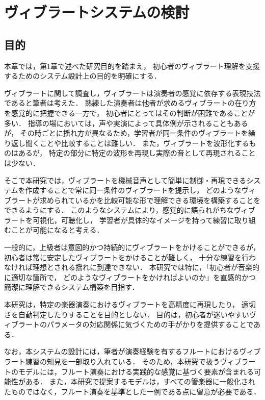 \section{ヴィブラートシステムの検討}

\subsection{目的}

本章では，第1章で述べた研究目的を踏まえ，
初心者のヴィブラート理解を支援するためのシステム設計上の目的を明確にする．

ヴィブラートに関して調査し，ヴィブラートは演奏者の感覚に依存する表現技法であると筆者は考えた．
熟練した演奏者は他者が求めるヴィブラートの在り方を感覚的に把握できる一方で，
初心者にとってはその判断が困難であることが多い．
指導の場においては，声や実演によって具体例が示されることもあるが，
その時ごとに揺れ方が異なるため，学習者が同一条件のヴィブラートを繰り返し聞くことや比較することは難しい．
また，ヴィブラートを波形化するもの\cite{Miyazaki19}はあるが，
特定の部分に特定の波形を再現し実際の音として再現されることは少ない．

そこで本研究では，ヴィブラートを機械音声として簡単に制御・再現できるシステムを作成することで常に同一条件のヴィブラートを提示し，
どのようなヴィブラートが求められているかを比較可能な形で理解できる環境を構築することをできるようにする．
このようなシステムにより，感覚的に語られがちなヴィブラートを可視化，可聴化し，
学習者が具体的なイメージを持って練習に取り組むことが可能になると考える．

一般的に，上級者は意図的かつ持続的にヴィブラートをかけることができるが，
初心者は常に安定したヴィブラートをかけることが難しく，
十分な練習を行わなければ理想とされる揺れに到達できない．
本研究では特に，「初心者が音楽的に適切な箇所で，
どのようなヴィブラートをかければよいのか」を直感的かつ簡潔に理解できるシステム構築を目指す．

本研究は，特定の楽器演奏におけるヴィブラートを高精度に再現したり，
適切さを自動判定したりすることを目的としない．
目的は，初心者が迷いやすいヴィブラートのパラメータの対応関係に気づくための手がかりを提供することである．

なお，本システムの設計には，筆者が演奏経験を有するフルートにおけるヴィブラート練習の知見を一部取り入れている．
そのため，本研究で扱うヴィブラートのモデルには，フルート演奏における実践的な感覚に基づく要素が含まれる可能性がある．
また，本研究で提案するモデルは，すべての管楽器に一般化されたものではなく，フルート演奏を基準とした一例である点に留意が必要である．


